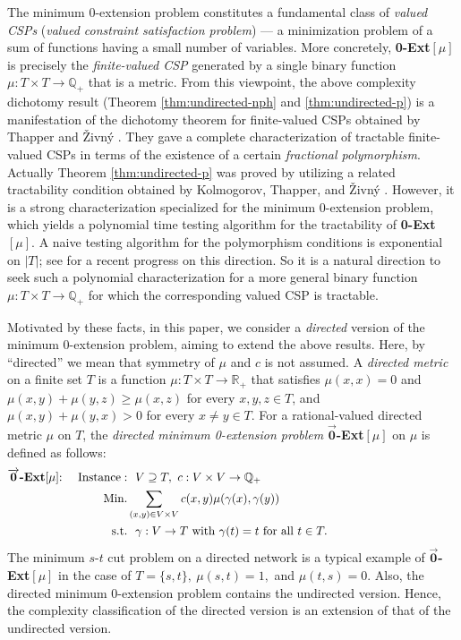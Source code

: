 \documentclass[11pt]{article}
\theoremstyle{definition}
\begin{document}
The minimum 0-extension problem
constitutes a fundamental class of \textit{valued CSPs} (\textit{valued constraint satisfaction problem}) \cite{hirai2016} --- a minimization problem of a sum of functions having a small number of variables. More concretely, \textbf{0-Ext}$[\mu]$ is precisely the \textit{finite-valued CSP} generated by a single binary function $\mu:T\times T\rightarrow \mathbb{Q}_+$ that is a metric. 
From this viewpoint, the above complexity dichotomy result (Theorem \ref{thm:undirected-nph} and \ref{thm:undirected-p}) is a manifestation of the dichotomy theorem for finite-valued CSPs obtained by Thapper and \v{Z}ivn\'{y} \cite{thapper2012}.
They gave a complete characterization of tractable finite-valued CSPs in terms of the existence of a certain \textit{fractional polymorphism}.
Actually Theorem \ref{thm:undirected-p} was proved by utilizing a related tractability condition obtained by Kolmogorov, Thapper, and \v{Z}ivn\'{y} \cite{kolmogorov2015}. However, it is a strong characterization specialized for the minimum 0-extension problem, which yields a polynomial time testing algorithm for the tractability of \textbf{0-Ext}$[\mu]$. A naive testing algorithm for the polymorphism conditions is exponential on $|T|$; see \cite{kolmogorov2019} for a recent progress on this direction. So it is a natural direction to seek such a polynomial characterization for a more general binary function $\mu:T\times T\rightarrow \mathbb{Q}_+$ for which the corresponding valued CSP is tractable.

Motivated by these facts, in this paper, we consider a \textit{directed} version of the minimum 0-extension problem, aiming to extend the above results. Here, by ``directed'' we mean that symmetry of $\mu$ and $c$ is not assumed. A \textit{directed metric} on a finite set $T$ is a function $\mu:T\times T\rightarrow \mathbb{R}_+$ that satisfies $\mu(x,x)=0$ and $\mu(x,y)+\mu(y,z)\geq \mu(x,z)$ for every $x,y,z\in T$, and $\mu(x,y)+\mu(y,x)>0$ for every $x\neq y\in T$. For a rational-valued directed metric $\mu$ on $T$, the \textit{directed minimum 0-extension problem} $\overrightarrow{\textbf{0}}$\textbf{-Ext}$[\mu]$ on $\mu$ is defined as follows:
\begin{align*}
\overrightarrow{\textbf{0}}\textbf{-Ext}[\mu]\mathrm{:\ \ \ \ } \mathrm{Instance}:&\mathrm{\ \ }V\supseteq T,\mathrm{\ }c:V\times V
\rightarrow \mathbb{Q}_{+}\\
\mathrm{Min.}&\displaystyle\sum_{\tiny (x,y)\in
V\times V\normalsize}c(x,y)\mu(\gamma(x),\gamma(y))
\\
\mathrm{s.t.}&\mathrm{\ \ }\gamma:V\rightarrow T\mathrm{\ with\ }\gamma(t)=t\mathrm{\ for\ all\ }t\in T.\mathrm{\ \ \ \ \ \ \ \ \ \ \ \ \ \ \ \ \ \ \ \ \ \ \ \ \ \ \ \ \ \ \ \ \ }
\end{align*}
The minimum $s$-$t$ cut problem on a directed network is a typical example of $\overrightarrow{\textbf{0}}$\textbf{-Ext}$[\mu]$ in the case of $T=\{s,t\},\ \mu(s,t)=1,$ and $\mu(t,s)=0$. Also, the directed minimum 0-extension problem contains the undirected version. Hence, the complexity classification of the directed version is an extension of that of the undirected version.
\end{document}
